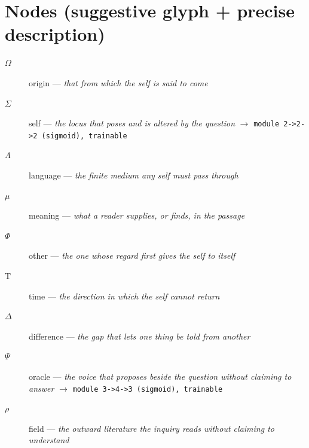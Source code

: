 \documentclass[11pt]{article}
\newcommand{\Tau}{\mathrm{T}}
\begin{document}
\section*{Nodes (suggestive glyph + precise description)}
\begin{description}\item[$ \Omega $] origin --- \emph{that from which the self is said to come}
\item[$ \Sigma $] self --- \emph{the locus that poses and is altered by the question} \quad $\rightarrow$ \texttt{module 2->2->2 (sigmoid), trainable}
\item[$ \Lambda $] language --- \emph{the finite medium any self must pass through}
\item[$ \mu $] meaning --- \emph{what a reader supplies, or finds, in the passage}
\item[$ \Phi $] other --- \emph{the one whose regard first gives the self to itself}
\item[$ \Tau $] time --- \emph{the direction in which the self cannot return}
\item[$ \Delta $] difference --- \emph{the gap that lets one thing be told from another}
\item[$ \Psi $] oracle --- \emph{the voice that proposes beside the question without claiming to answer} \quad $\rightarrow$ \texttt{module 3->4->3 (sigmoid), trainable}
\item[$ \rho $] field --- \emph{the outward literature the inquiry reads without claiming to understand}\end{description}
\end{document}
